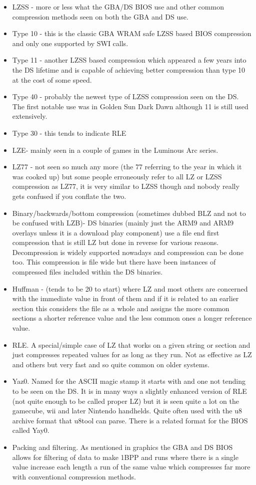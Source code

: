 \documentclass[
]{book}
\providecommand{\tightlist}{%
  \setlength{\itemsep}{0pt}\setlength{\parskip}{0pt}}
\begin{document}
\begin{itemize}
\tightlist
\item
  LZSS - more or less what the GBA/DS BIOS use and other common compression methods seen on both the GBA and DS use.
\item
  Type 10 - this is the classic GBA WRAM safe LZSS based BIOS compression and only one supported by SWI calls.
\item
  Type 11 - another LZSS based compression which appeared a few years into the DS lifetime and is capable of achieving better compression than type 10 at the cost of some speed.
\item
  Type 40 - probably the newest type of LZSS compression seen on the DS. The first notable use was in Golden Sun Dark Dawn although 11 is still used extensively.
\item
  Type 30 - this tends to indicate RLE
\item
  LZE- mainly seen in a couple of games in the Luminous Arc series.
\item
  LZ77 - not seen so much any more (the 77 referring to the year in which it was cooked up) but some people erroneously refer to all LZ or LZSS compression as LZ77, it is very similar to LZSS though and nobody really gets confused if you conflate the two.
\item
  Binary/backwards/bottom compression (sometimes dubbed BLZ and not to be confused with LZB)- DS binaries (mainly just the ARM9 and ARM9 overlays unless it is a download play component) use a file end first compression that is still LZ but done in reverse for various reasons. Decompression is widely supported nowadays and compression can be done too. This compression is file wide but there have been instances of compressed files included within the DS binaries.
\item
  Huffman - (tends to be 20 to start) where LZ and most others are concerned with the immediate value in front of them and if it is related to an earlier section this considers the file as a whole and assigns the more common sections a shorter reference value and the less common ones a longer reference value.
\item
  RLE. A special/simple case of LZ that works on a given string or section and just compresses repeated values for as long as they run. Not as effective as LZ and others but very fast and so quite common on older systems.
\item
  Yaz0. Named for the ASCII magic stamp it starts with and one not tending to be seen on the DS. It is in many ways a slightly enhanced version of RLE (not quite enough to be called proper LZ) but it is seen quite a lot on the gamecube, wii and later Nintendo handhelds. Quite often used with the u8 archive format that u8tool can parse. There is a related format for the BIOS called Yay0.
\item
  Packing and filtering. As mentioned in graphics the GBA and DS BIOS allows for filtering of data to make 1BPP and runs where there is a single value increase each length a run of the same value which compresses far more with conventional compression methods.
\end{itemize}
\end{document}
